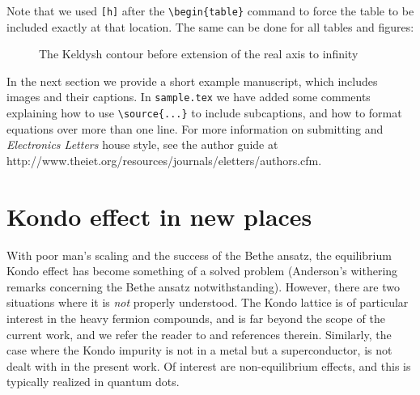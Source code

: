 \documentclass[twocolumn]{el-author}
\begin{document}
Note that we used \verb"[h]" after the \verb"\begin{table}" command to force the table to be included exactly at that location.  The same can be done for
all tables and figures:

\begin{figure}[h]
\caption{The Keldysh contour before extension of the real axis to infinity
\source{}}
\end{figure}

In the next section we provide a short example manuscript, which includes images and their captions.  In \verb"sample.tex" we have added some comments explaining how to use \verb"\source{...}" to include subcaptions, and how to format equations over more than one line.  For more information on submitting and \emph{Electronics Letters} house style, see the author guide at http://www.theiet.org/resources/journals/eletters/authors.cfm.

\section{Kondo effect in new places}
With poor man's scaling \cite{1} and the success of the Bethe ansatz, the equilibrium Kondo effect has become something of a solved problem (Anderson's withering remarks concerning the Bethe ansatz notwithstanding).  However, there are two situations where it is \emph{not} properly understood.  The Kondo lattice is of particular interest in the heavy fermion compounds, and is far beyond the scope of the current work, and we refer the reader to \cite{2} and references therein.  Similarly, the case where the Kondo impurity is not in a metal but a superconductor, is not dealt with in the present work.  Of interest are non-equilibrium effects, and this is typically realized in quantum dots.
\end{document}
